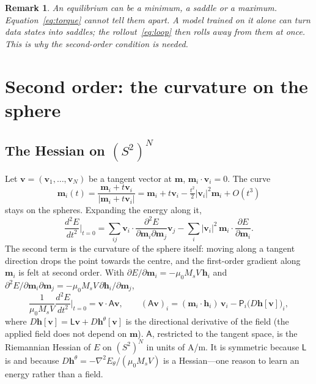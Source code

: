\documentclass[11pt,a4paper]{article}
\newcommand{\m}{\bm{m}}
\newcommand{\h}{\bm{h}}
\newcommand{\vv}{\bm{v}}
\newcommand{\proj}{\mathsf{P}}
\newtheorem*{remark}{Remark}
\begin{document}
\begin{remark}
An equilibrium can be a minimum, a saddle or a maximum. Equation~\eqref{eq:torque} cannot tell them
apart. A model trained on it alone can turn data states into saddles; the rollout~\eqref{eq:loop} then
rolls away from them at once. This is why the second-order condition is needed.
\end{remark}

\section{Second order: the curvature on the sphere}
\label{sec:curvature}

\subsection{\texorpdfstring{The Hessian on $(S^2)^N$}{The Hessian on the product of spheres}}

Let $\vv=(\vv_1,\dots,\vv_N)$ be a tangent vector at $\m$, $\m_i\cdot\vv_i=0$. The curve
\begin{equation}
  \m_i(t) = \frac{\m_i + t\vv_i}{|\m_i + t\vv_i|}
  = \m_i + t\vv_i - \tfrac{t^2}{2}|\vv_i|^2\m_i + O(t^3)
\end{equation}
stays on the spheres. Expanding the energy along it,
\begin{equation}
  \frac{d^2E}{dt^2}\Big|_{t=0}
  = \sum_{ij}\vv_i\cdot\frac{\partial^2E}{\partial\m_i\partial\m_j}\vv_j
    - \sum_i |\vv_i|^2\,\m_i\cdot\frac{\partial E}{\partial\m_i}.
\end{equation}
The second term is the curvature of the sphere itself: moving along a tangent direction drops the
point towards the centre, and the first-order gradient along $\m_i$ is felt at second order. With
$\partial E/\partial\m_i = -\mu_0M_sV\,\h_i$ and $\partial^2E/\partial\m_i\partial\m_j =
-\mu_0M_sV\,\partial\h_i/\partial\m_j$,
\begin{equation}
  \frac{1}{\mu_0M_sV}\frac{d^2E}{dt^2}\Big|_{t=0} = \vv\cdot\mathsf{A}\vv,
  \qquad
  (\mathsf{A}\vv)_i = (\m_i\cdot\h_i)\,\vv_i - \proj_i\bigl(D\h[\vv]\bigr)_i ,
  \label{eq:hessian}
\end{equation}
where $D\h[\vv] = \mathsf{L}\vv + D\h^\theta[\vv]$ is the directional derivative of the field (the
applied field does not depend on $\m$). $\mathsf{A}$, restricted to the tangent space, is the
Riemannian Hessian of $E$ on $(S^2)^N$ in units of A/m. It is symmetric because $\mathsf{L}$ is and
because $D\h^\theta = -\nabla^2E_\theta/(\mu_0M_sV)$ is a Hessian---one reason to learn an energy rather
than a field.
\end{document}
